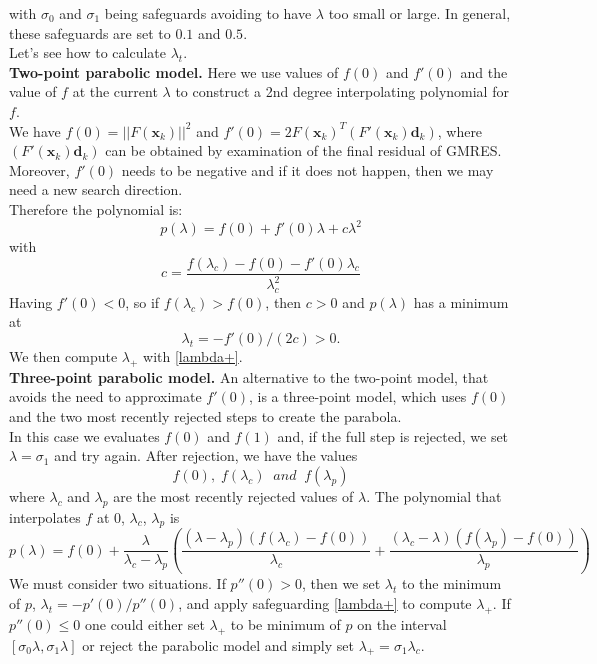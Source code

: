   with $\sigma_0$ and $\sigma_1$ being safeguards avoiding to have $\lambda$ too small or large. In general, these safeguards are set to $0.1$ and $0.5$.\\
  Let's see how to calculate $\lambda_t$.\\
\noindent\textbf{Two-point parabolic model.} Here we use values of $f(0)$ and $f'(0)$ and the value of $f$ at the current $\lambda$ to construct a 2nd degree interpolating polynomial for $f$. \\
We have $f(0)= ||F(\textbf{x}_k)||^2$ and $f'(0)= 2 F(\textbf{x}_k)^T (F'(\textbf{x}_k)\textbf{d}_k)$, where $(F'(\textbf{x}_k)\textbf{d}_k)$ can be obtained by examination of the final residual of GMRES. Moreover, $f'(0)$ needs to be negative and if it does not happen, then we may need a new search direction. \\
Therefore the polynomial is:
\begin{equation*}
p(\lambda) = f(0) + f'(0)\lambda + c \lambda^2
\end{equation*}
with 
\begin{equation*}
c= \frac{f(\lambda_c)-f(0)-f'(0)\lambda_c}{\lambda_c^2}
\end{equation*}
Having $f'(0)<0$, so if $f(\lambda_c)>f(0)$, then $c>0$ and $p(\lambda)$ has a minimum at 
\begin{equation*}
\lambda_t = -f'(0)/(2c) > 0.
\end{equation*}
We then compute $\lambda_+$ with \eqref{lambda+}. \\
\noindent\textbf{Three-point parabolic model.}
An alternative to the two-point model, that avoids the need to approximate $f'(0)$, is a three-point model, which uses $f(0)$ and the two most recently rejected steps to create the parabola.\\
In this case we evaluates $f(0)$ and $f(1)$ and, if the full step is rejected, we set $\lambda=\sigma_1$ and try again. After rejection, we have the values 
\begin{equation*}
f(0),\; f(\lambda_c) \; \; and \; \; f(\lambda_p)
\end{equation*}
where $\lambda_c$ and $\lambda_p$ are the most recently rejected values of $\lambda$. The polynomial that interpolates $f$ at $0$, $\lambda_c$, $\lambda_p$ is 
\begin{equation*}
p(\lambda)= f(0) + \frac{\lambda}{\lambda_c - \lambda_p}\left(\frac{(\lambda-\lambda_p)(f(\lambda_c)-f(0))}{\lambda_c} + \frac{(\lambda_c-\lambda)(f(\lambda_p)-f(0))}{\lambda_p}\right)
\end{equation*}
We must consider two situations. If $p''(0)>0$, then we set $\lambda_t$ to the minimum of $p$, 
$\lambda_t= -p'(0)/p''(0)$, and apply safeguarding \eqref{lambda+} to compute $\lambda_+$. If $p''(0) \leq 0$ one could either set $\lambda_+$ to be minimum of $p$ on the interval $[\sigma_0 \lambda, \sigma_1 \lambda]$ or reject the parabolic model and simply set $\lambda_+= \sigma_1  \lambda_c$. \\


